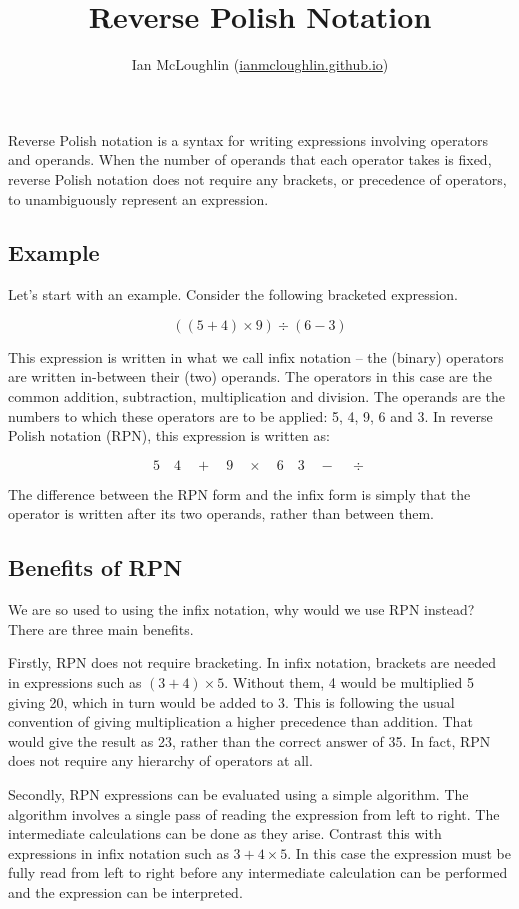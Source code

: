 \documentclass[twocolumn]{iagproc}
\title{Reverse Polish Notation}
\author{Ian McLoughlin (\href{https://ianmcloughlin.github.io}{ianmcloughlin.github.io})}
\begin{document}
\maketitle
\noindent
Reverse Polish notation is a syntax for writing expressions involving operators and operands.
When the number of operands that each operator takes is fixed, reverse Polish notation does not require any brackets, or precedence of operators, to unambiguously represent an expression.

\subsection*{Example}
Let’s start with an example.
Consider the following bracketed expression.

$$ ((5 + 4) \times 9) \div (6 - 3) $$

This expression is written in what we call infix notation -- the (binary) operators are written in-between their (two) operands.
The operators in this case are the common addition, subtraction, multiplication and division.
The operands are the numbers to which these operators are to be applied: 5, 4, 9, 6 and 3.
In reverse Polish notation (RPN), this expression is written as:

$$ 5 \quad 4 \quad + \quad 9 \quad \times \quad  6 \quad 3 \quad - \quad \div $$

The difference between the RPN form and the infix form is simply that the operator is written after its two operands, rather than between them.

\subsection*{Benefits of RPN}
We are so used to using the infix notation, why would we use RPN instead?
There are three main benefits.

Firstly, RPN does not require bracketing.
In infix notation, brackets are needed in expressions such as $(3 + 4) \times 5$.
Without them, 4 would be multiplied 5 giving 20, which in turn would be added to 3.
This is following the usual convention of giving multiplication a higher precedence than addition.
That would give the result as 23, rather than the correct answer of 35.
In fact, RPN does not require any hierarchy of operators at all.

Secondly, RPN expressions can be evaluated using a simple algorithm.
The algorithm involves a single pass of reading the expression from left to right.
The intermediate calculations can be done as they arise.
Contrast this with expressions in infix notation such as $3 + 4 \times 5$.
In this case the expression must be fully read from left to right before any intermediate calculation can be performed and the expression can be interpreted.
\end{document}

